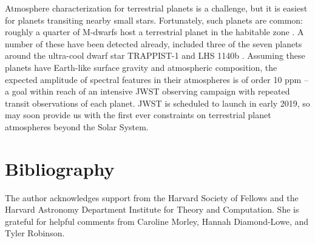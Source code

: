 \documentclass[graybox,natbib,nosecnum]{svmult}
\begin{document}
Atmosphere characterization for terrestrial planets is a challenge, but it is easiest for planets transiting nearby small stars.  Fortunately, such planets are common: roughly a quarter of M-dwarfs host a terrestrial planet in the habitable zone \citep{dressing15}. A number of these have been detected already, included three of the seven planets around the ultra-cool dwarf star TRAPPIST-1 and LHS 1140b \citep{gillon17, dittmann17}. Assuming these planets have Earth-like surface gravity and atmospheric composition, the expected amplitude of spectral features in their atmospheres is of order 10 ppm -- a goal within reach of an intensive JWST observing campaign with repeated transit observations of each planet.  JWST is scheduled to launch in early 2019, so may soon provide us with the first ever constraints on terrestrial planet atmospheres beyond the Solar System. 

\section{Bibliography}

\begin{acknowledgement}
The author acknowledges support from the Harvard Society of Fellows and the Harvard Astronomy Department Institute for Theory and Computation. She is grateful for helpful comments from Caroline Morley, Hannah Diamond-Lowe, and Tyler Robinson.
\end{acknowledgement}

\end{document}
